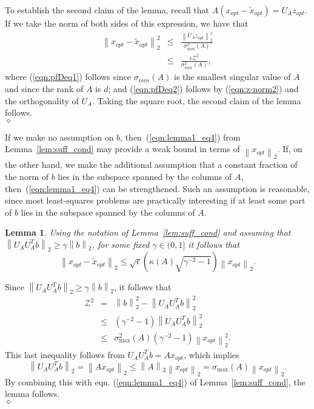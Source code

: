 \documentclass[11pt]{article}
\newcommand{\TNorm }[1]{\mbox{}\left\|#1\right\|_2  }
\newcommand{\VTTNorm }[1]{\mbox{}\left\|#1\right\|_2  }
\newcommand{\VTTNormS}[1]{\mbox{}\left\|#1\right\|_2^2}
\newtheorem{lemma}{Lemma}
\newenvironment{Proof}{\noindent {\em Proof:}}{\\\hspace*{\fill}\mbox{$\diamond$}}
\begin{document}
\begin{Proof}
To establish the second claim of the lemma, recall that $A(x_{opt}-\tilde{x}_{opt})=U_Az_{opt}$. If we take the norm of both sides of this expression, we have that
\begin{eqnarray}
\VTTNormS{ x_{opt}-\tilde{x}_{opt} } \label{eqn:pfDeq1}
  &\leq& \frac {\VTTNormS{U_Az_{opt}}} {\sigma_{min}^2(A)} \\
\label{eqn:pfDeq2}
  &\leq& \frac {\epsilon\mathcal{Z}^2} {\sigma_{min}^2(A)},
\end{eqnarray}
where (\ref{eqn:pfDeq1}) follows since $\sigma_{min}(A)$ is the
smallest singular value of $A$ and since the rank of $A$ is
$d$; and (\ref{eqn:pfDeq2}) follows by
(\ref{eqn:z-norm2}) and the orthogonality of $U_A$. Taking the square root, the second claim of the
lemma follows.
\end{Proof}

\noindent If we make no assumption on $b$, then~(\ref{eqn:lemma1_eq4}) from
Lemma~\ref{lem:suff_cond} may provide a weak bound in terms of
$\VTTNorm{x_{opt}}$. If, on the other hand, we make the additional
assumption that a constant fraction of the norm of $b$ lies in
the subspace spanned by the columns of $A$,
then~(\ref{eqn:lemma1_eq4}) can be strengthened.
Such an assumption is reasonable, since most least-squares problems are
practically interesting if at least some part of $b$ lies in the subspace
spanned by the columns of $A$.

\begin{lemma}
\label{lem:suff_cond2}
Using the notation of Lemma~\ref{lem:suff_cond} and assuming
that $\VTTNorm{U_AU_A^Tb} \geq \gamma\VTTNorm{b}$, for some fixed
$\gamma \in (0,1]$ it follows that
\begin{equation}
\VTTNorm{x_{opt}-\tilde{x}_{opt}}
  \leq \sqrt{\epsilon}\left(\kappa(A)\sqrt{\gamma^{-2}-1}\right)\VTTNorm{x_{opt}} .
\end{equation}
\end{lemma}
\begin{Proof}
Since $\VTTNorm{U_AU_A^Tb} \geq \gamma\VTTNorm{b}$, it follows that
\begin{eqnarray}
         \mathcal{Z}^2
\nonumber    &=&    \VTTNormS{b} - \VTTNormS{U_A U_A^T b}          \\
\nonumber    &\leq& (\gamma^{-2}-1) \VTTNormS{U_A U_A^T b}         \\
\nonumber    &\leq&
{\sigma_{\max}^{2}(A)}(\gamma^{-2}-1)\VTTNormS{x_{opt}}  .
\end{eqnarray}
This last inequality follows from $U_AU_A^Tb = Ax_{opt}$, which implies $$ \VTTNorm{U_A U_A^T b} = \VTTNorm{Ax_{opt}} \leq \TNorm{A} \VTTNorm{x_{opt}} = \sigma_{\max}\left(A\right)\VTTNorm{x_{opt}}. $$
By combining this with eqn. (\ref{eqn:lemma1_eq4}) of
Lemma~\ref{lem:suff_cond}, the lemma follows.
\end{Proof}
\end{document}
